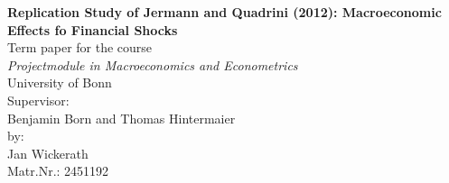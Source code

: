 \begin{titlepage}
\begin{center}

\textbf{\Huge Replication Study of Jermann and Quadrini (2012): Macroeconomic
  Effects fo Financial Shocks}
\\[5cm]
\Large 
Term paper for the course\\
\textit{Projectmodule in Macroeconomics and Econometrics}\\
University of Bonn\\
\vfill
Supervisor: \\
Benjamin Born and Thomas Hintermaier\\[2cm]

by:\\
Jan Wickerath\\
Matr.Nr.: 2451192


\end{center}
\end{titlepage}

\thispagestyle{empty}
